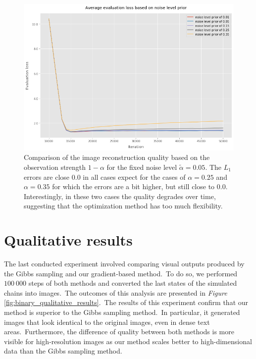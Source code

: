 \documentclass[shortabstract, english, lic]{iithesis}
\theoremstyle{default_theorem_style}\newtheorem{theorem}{Theorem}
\theoremstyle{default_theorem_style}\newtheorem{definition}{Definition}
\begin{document}
\begin{figure}[H]
\centering
\includegraphics[scale=0.55]{binary_noise_level_prior_plots}
\caption{Comparison of the image reconstruction quality based on the observation strength $1 - \alpha$ for the
fixed noise level $\tilde{\alpha} = 0.05$. The $L_1$ errors are close $0.0$ in all cases expect for the cases of
$\alpha = 0.25$ and $\alpha = 0.35$ for which the errors are a bit higher, but still close to $0.0$. Interestingly,
in these two cases the quality degrades over time, suggesting that the optimization method has too
much flexibility.}
\label{fig:binary_noise_level_prior_plots}
\end{figure}

\section{Qualitative results}

The last conducted experiment involved comparing visual outputs produced by the Gibbs sampling and our
gradient-based method.\ To do so, we performed $100\ 000$ steps of both methods and converted the last states
of the simulated chains into images.\ The outcomes of this analysis are presented in \textit{Figure}
\ref{fig:binary_qualitative_results}.\ The results of this experiment confirm that our method is superior to
the Gibbs sampling method.\ In particular, it generated images that look identical to the original images,
even in dense text areas.\ Furthermore, the difference of quality between both methods is more visible for
high-resolution images as our method scales better to high-dimensional data than the Gibbs sampling
method.\newline\newline\newline\newline\newline\newline
\end{document}
